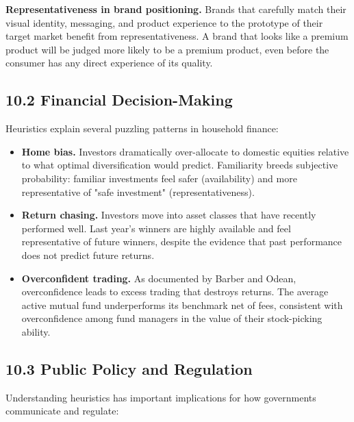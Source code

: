\documentclass[12pt, letterpaper]{article}
\begin{document}
\textbf{Representativeness in brand positioning.} Brands that carefully match their visual identity, messaging, and product experience to the prototype of their target market benefit from representativeness. A brand that looks like a premium product will be judged more likely to be a premium product, even before the consumer has any direct experience of its quality.


\subsection{10.2 Financial Decision-Making}


Heuristics explain several puzzling patterns in household finance:

\begin{itemize}
\item \textbf{Home bias.} Investors dramatically over-allocate to domestic equities relative to what optimal diversification would predict. Familiarity breeds subjective probability: familiar investments feel safer (availability) and more representative of "safe investment" (representativeness).
\item \textbf{Return chasing.} Investors move into asset classes that have recently performed well. Last year's winners are highly available and feel representative of future winners, despite the evidence that past performance does not predict future returns.
\item \textbf{Overconfident trading.} As documented by Barber and Odean, overconfidence leads to excess trading that destroys returns. The average active mutual fund underperforms its benchmark net of fees, consistent with overconfidence among fund managers in the value of their stock-picking ability.
\end{itemize}


\subsection{10.3 Public Policy and Regulation}


Understanding heuristics has important implications for how governments communicate and regulate:
\end{document}
